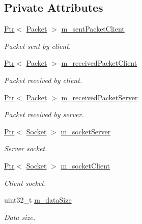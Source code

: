 \subsection*{Private Attributes}
\begin{DoxyCompactItemize}
\item 
\hyperlink{classns3_1_1Ptr}{Ptr}$<$ \hyperlink{classns3_1_1Packet}{Packet} $>$ \hyperlink{classIpv6FragmentationTest_ac14aa60abba7c0ea12a25e4ad2165133}{m\+\_\+sent\+Packet\+Client}
\begin{DoxyCompactList}\small\item\em Packet sent by client. \end{DoxyCompactList}\item 
\hyperlink{classns3_1_1Ptr}{Ptr}$<$ \hyperlink{classns3_1_1Packet}{Packet} $>$ \hyperlink{classIpv6FragmentationTest_af8d5fd0d59dea9ddb85589998728fea6}{m\+\_\+received\+Packet\+Client}
\begin{DoxyCompactList}\small\item\em Packet received by client. \end{DoxyCompactList}\item 
\hyperlink{classns3_1_1Ptr}{Ptr}$<$ \hyperlink{classns3_1_1Packet}{Packet} $>$ \hyperlink{classIpv6FragmentationTest_abe697e5a49ddbe098865a13c306d2f94}{m\+\_\+received\+Packet\+Server}
\begin{DoxyCompactList}\small\item\em Packet received by server. \end{DoxyCompactList}\item 
\hyperlink{classns3_1_1Ptr}{Ptr}$<$ \hyperlink{classns3_1_1Socket}{Socket} $>$ \hyperlink{classIpv6FragmentationTest_a826cfa2a3fcb43dac98cbd8cdc69b151}{m\+\_\+socket\+Server}
\begin{DoxyCompactList}\small\item\em Server socket. \end{DoxyCompactList}\item 
\hyperlink{classns3_1_1Ptr}{Ptr}$<$ \hyperlink{classns3_1_1Socket}{Socket} $>$ \hyperlink{classIpv6FragmentationTest_a42352629fa60d0a232d6494f6f4210f2}{m\+\_\+socket\+Client}
\begin{DoxyCompactList}\small\item\em Client socket. \end{DoxyCompactList}\item 
uint32\+\_\+t \hyperlink{classIpv6FragmentationTest_a5fa7017430c2a39ffb33c5bdaaed7402}{m\+\_\+data\+Size}
\begin{DoxyCompactList}\small\item\em Data size. \end{DoxyCompactList}\item 

\end{DoxyCompactItemize}
